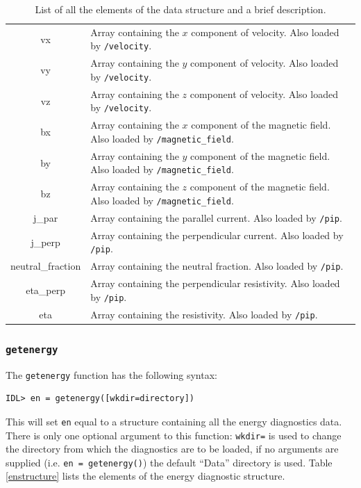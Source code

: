 \documentclass[11pt]{article}
\begin{document}
\begin{table}[!htbp]
\begin{center}
\begin{tabular}{|c|p{}|}
vx& Array containing the $x$ component of velocity. Also loaded by \texttt{/velocity}.\\
vy&Array containing the $y$ component of velocity. Also loaded by \texttt{/velocity}.\\
vz&Array containing the $z$ component of velocity. Also loaded by \texttt{/velocity}.\\
bx&Array containing the $x$ component of the magnetic field. Also loaded by \texttt{/magnetic\_field}.\\
by&Array containing the $y$ component of the magnetic field. Also loaded by \texttt{/magnetic\_field}.\\
bz&Array containing the $z$ component of the magnetic field. Also loaded by \texttt{/magnetic\_field}.\\
j\_par&Array containing the parallel current. Also loaded by \texttt{/pip}.\\
j\_perp&Array containing the perpendicular current. Also loaded by \texttt{/pip}.\\
neutral\_fraction&Array containing the neutral fraction. Also loaded by \texttt{/pip}.\\
eta\_perp&Array containing the perpendicular resistivity. Also loaded by \texttt{/pip}.\\
eta&Array containing the resistivity. Also loaded by \texttt{/pip}.\\
\hline
\end{tabular}
\end{center}
\caption{List of all the elements of the data structure and a brief description.}
\label{datastructure}
\end{table}

\subsubsection{\texttt{getenergy}}
The \texttt{getenergy} function has the following syntax:
\begin{verbatim}
IDL> en = getenergy([wkdir=directory])
\end{verbatim}
This will set \texttt{en} equal to a structure containing all the energy diagnostics data. There is only one optional argument to this function: \texttt{wkdir=} is used to change the directory from which the diagnostics are to be loaded, if no arguments are supplied (i.e. \texttt{en = getenergy()}) the default ``Data'' directory is used. Table \ref{enstructure} lists the elements of the energy diagnostic structure.
\end{document}

